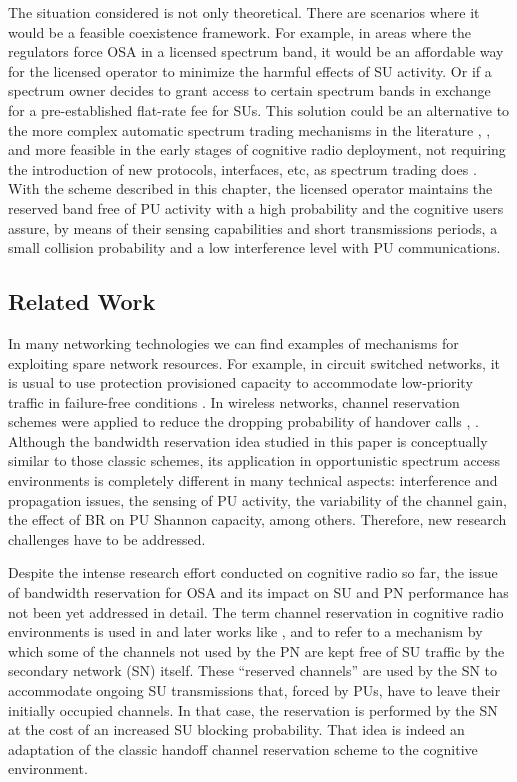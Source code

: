 The situation considered is not only theoretical. There are scenarios where it would be a feasible coexistence framework. For example, in areas where the regulators force OSA in a licensed spectrum band, it would be an affordable way for the licensed operator to minimize the harmful effects of SU activity. Or if a spectrum owner decides to grant access to certain spectrum bands in exchange for a pre-established flat-rate fee for SUs. This solution could be an alternative to the more complex automatic spectrum trading mechanisms in the literature \cite{ref:Gao2011}, \cite{ref:Yu2010}, and more feasible in the early stages of cognitive radio deployment, not requiring the introduction of new protocols, interfaces, etc, as spectrum trading does \cite{ref:Yang2011}. With the scheme described in this chapter, the licensed operator maintains the reserved band free of PU activity with a high probability and the cognitive users assure, by means of their sensing capabilities and short transmissions periods, a small collision probability and a low interference level with PU communications.
 
\subsection{Related Work}\label{sec:RelatedWork}
In many networking technologies we can find examples of mechanisms for exploiting spare network resources. For example, in circuit switched networks, it is usual to use protection provisioned capacity to accommodate low-priority traffic in failure-free conditions \cite{ref:Vasseur2004}.
In wireless networks, channel reservation schemes were applied to reduce the dropping probability of handover calls \cite{ref:Ramjee1996}, \cite{ref:Vazquez2006}. 
Although the bandwidth reservation idea studied in this paper is conceptually similar to those classic schemes, its application in opportunistic spectrum access environments is completely different in many technical aspects: interference and propagation issues, the sensing of PU activity, the variability of the channel gain, the effect of BR on PU Shannon capacity, among others. Therefore, new research challenges have to be addressed.

Despite the intense research effort conducted on cognitive radio so far, the issue of bandwidth reservation for OSA and its impact on SU and PN performance has not been yet addressed in detail.
The term channel reservation in cognitive radio environments is used in \cite{ref:Zhu2007} and later works like \cite{ref:Martinez2009}, \cite{ref:Ahmed2009} and \cite{ref:Lai2011} to refer to a mechanism by which some of the channels not used by the PN are kept free of SU traffic by the secondary network (SN) itself. These ``reserved channels'' are used by the SN to accommodate ongoing SU transmissions that, forced by PUs, have to leave their initially occupied channels. In that case, the reservation is performed by the SN at the cost of an increased SU blocking probability. That idea is indeed an adaptation of the classic handoff channel reservation scheme to the cognitive environment.

